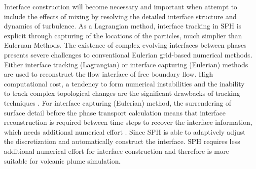 Interface construction will become necessary and important when attempt to include the effects of mixing by resolving the detailed interface structure and dynamics of turbulence. 
As a Lagrangian method, interface tracking in SPH is explicit through capturing of the locations of the particles, much simplier than Euleruan Methods.
The existence of complex evolving interfaces between phases presents severe challenges to conventional Eulerian grid-based numerical methods. Either interface tracking (Lagrangian) \citep{harlow1965numerical, wrobel1991computational, cheng1995simplified} or interface capturing (Eulerian) \citep{hirt1981volume, youngs1982time, gerlach2006comparison, gopala2008volume} methods are used to reconstruct the flow interface of free boundary flow. High computational cost, a tendency to form numerical instabilities and the inability to track complex topological changes are the significant drawbacks of tracking techniques \citep{hirt1981volume, unverdi1992front, anderson1998diffuse}. For interface capturing (Eulerian) method, the surrendering of surface detail before the phase transport calculation means that interface reconstruction is required between time steps to recover the interface information, which needs additional numerical effort \citep{hirt1981volume, youngs1982time}.
Since SPH is able to adaptively adjust the discretization and automatically construct the interface. SPH requires less additional numerical effort for interface construction and therefore is more suitable for volcanic plume simulation.
 

